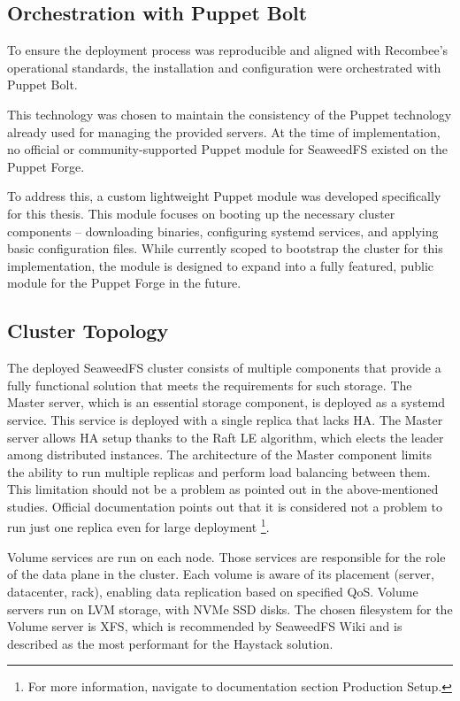 \subsection{Orchestration with Puppet Bolt}
To ensure the deployment process was reproducible and aligned with Recombee's operational standards, the installation and configuration were orchestrated with Puppet Bolt.

This technology was chosen to maintain the consistency of the Puppet technology already used for managing the provided servers. At the time of implementation, no official or community-supported Puppet module for SeaweedFS existed on the Puppet Forge. 

To address this, a custom lightweight Puppet module was developed specifically for this thesis. This module focuses on booting up the necessary cluster components -- downloading binaries, configuring systemd services, and applying basic configuration files. While currently scoped to bootstrap the cluster for this implementation, the module is designed to expand into a fully featured, public module for the Puppet Forge in the future.

\subsection{Cluster Topology}
The deployed SeaweedFS cluster consists of multiple components that provide a fully functional solution that meets the requirements for such storage. The Master server, which is an essential storage component, is deployed as a systemd service. This service is deployed with a single replica that lacks HA. The Master server allows HA setup thanks to the Raft LE algorithm, which elects the leader among distributed instances. The architecture of the Master component limits the ability to run multiple replicas and perform load balancing between them. This limitation should not be a problem as pointed out in the above-mentioned studies. Official documentation points out that it is considered not a problem to run just one replica even for large deployment \cite{seaweedfs_seaweedfs_2024} \footnote{For more information, navigate to documentation section Production Setup.}.

Volume services are run on each node. Those services are responsible for the role of the data plane in the cluster. Each volume is aware of its placement (server, datacenter, rack), enabling data replication based on specified QoS. Volume servers run on LVM storage, with NVMe SSD disks. The chosen filesystem for the Volume server is XFS, which is recommended by SeaweedFS Wiki and is described as the most performant for the Haystack solution. \cite{seaweedfs_seaweedfs_2024, beaver_finding_2010} 

